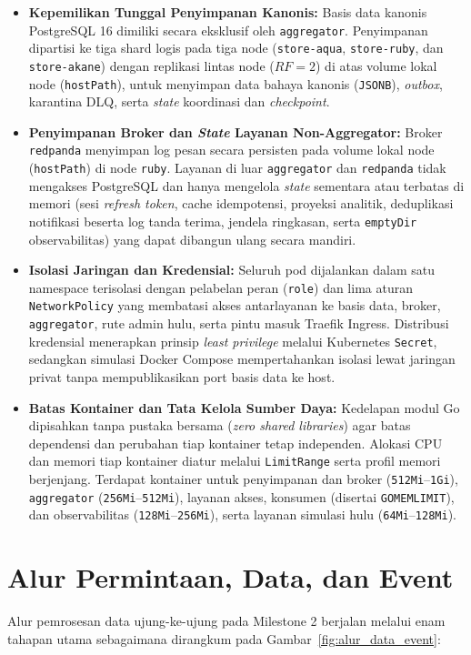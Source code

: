 \begin{itemize}
    \item \textbf{Kepemilikan Tunggal Penyimpanan Kanonis:} Basis data kanonis PostgreSQL 16 dimiliki secara eksklusif oleh \texttt{aggregator}. Penyimpanan dipartisi ke tiga shard logis pada tiga node (\texttt{store-aqua}, \texttt{store-ruby}, dan \texttt{store-akane}) dengan replikasi lintas node ($RF=2$) di atas volume lokal node (\texttt{hostPath}), untuk menyimpan data bahaya kanonis (\texttt{JSONB}), \textit{outbox}, karantina DLQ, serta \textit{state} koordinasi dan \textit{checkpoint}.
    \item \textbf{Penyimpanan Broker dan \textit{State} Layanan Non-Aggregator:} Broker \texttt{redpanda} menyimpan log pesan secara persisten pada volume lokal node (\texttt{hostPath}) di node \texttt{ruby}. Layanan di luar \texttt{aggregator} dan \texttt{redpanda} tidak mengakses PostgreSQL dan hanya mengelola \textit{state} sementara atau terbatas di memori (sesi \textit{refresh token}, cache idempotensi, proyeksi analitik, deduplikasi notifikasi beserta log tanda terima, jendela ringkasan, serta \texttt{emptyDir} observabilitas) yang dapat dibangun ulang secara mandiri.
    \item \textbf{Isolasi Jaringan dan Kredensial:} Seluruh pod dijalankan dalam satu namespace terisolasi dengan pelabelan peran (\texttt{role}) dan lima aturan \texttt{NetworkPolicy} yang membatasi akses antarlayanan ke basis data, broker, \texttt{aggregator}, rute admin hulu, serta pintu masuk Traefik Ingress. Distribusi kredensial menerapkan prinsip \textit{least privilege} melalui Kubernetes \texttt{Secret}, sedangkan simulasi Docker Compose mempertahankan isolasi lewat jaringan privat tanpa mempublikasikan port basis data ke host.
    \item \textbf{Batas Kontainer dan Tata Kelola Sumber Daya:} Kedelapan modul Go dipisahkan tanpa pustaka bersama (\textit{zero shared libraries}) agar batas dependensi dan perubahan tiap kontainer tetap independen. Alokasi CPU dan memori tiap kontainer diatur melalui \texttt{LimitRange} serta profil memori berjenjang. Terdapat kontainer untuk penyimpanan dan broker (\texttt{512Mi}--\texttt{1Gi}), \texttt{aggregator} (\texttt{256Mi}--\texttt{512Mi}), layanan akses, konsumen (disertai \texttt{GOMEMLIMIT}), dan observabilitas (\texttt{128Mi}--\texttt{256Mi}), serta layanan simulasi hulu (\texttt{64Mi}--\texttt{128Mi}).
\end{itemize}

\section{Alur Permintaan, Data, dan Event}
Alur pemrosesan data ujung-ke-ujung pada Milestone 2 berjalan melalui enam tahapan utama sebagaimana dirangkum pada Gambar~\ref{fig:alur_data_event}:

